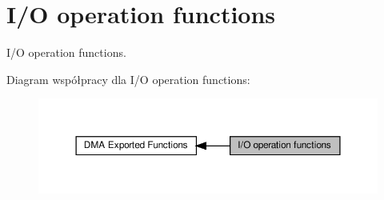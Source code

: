 \hypertarget{group___d_m_a___exported___functions___group2}{}\section{I/O operation functions}
\label{group___d_m_a___exported___functions___group2}


I/O operation functions.  


Diagram współpracy dla I/O operation functions\+:\nopagebreak
\begin{figure}[H]
\begin{center}
\leavevmode
\includegraphics[width=350pt]{group___d_m_a___exported___functions___group2}
\end{center}
\end{figure}
